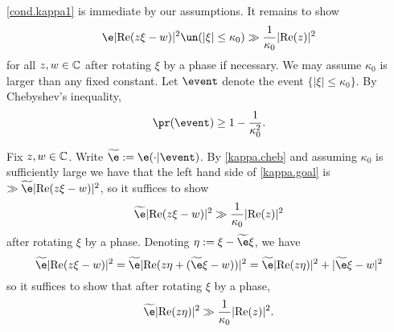 \documentclass[aop,preprint]{imsart}
\theoremstyle{plain}
\newtheorem{lemma}[theorem]{Lemma}
\theoremstyle{definition}
\theoremstyle{remark}
\numberwithin{equation}{section}
\numberwithin{theorem}{section}
\def \re {\mathrm{Re}}
\begin{document}



\eqref{cond.kappa1} is immediate by our assumptions. 
It remains to show 
\begin{equation}	\label{kappa.goal}
\e | \re(z\xi - w)|^2\un(|\xi|\le {\kappa_0}) \gg \frac1{\kappa_0} |\re(z)|^2
\end{equation}
for all $z,w\in {\mathbb C}$ after rotating $\xi$ by a phase if necessary.
We may assume $\kappa_0$ is larger than any fixed constant.
Let $\event$ denote the event $\{|\xi|\le \kappa_0\}$. 
By Chebyshev's inequality,
\begin{equation}	\label{kappa.cheb}
\pr(\event) \ge 1-\frac1{\kappa_0^2}.
\end{equation}

Fix $z,w\in {\mathbb C}$.
Write $\widetilde{\e}:= \e(\cdot|\event)$.
By \eqref{kappa.cheb} and assuming $\kappa_0$ is sufficiently large we have that the left hand side of \eqref{kappa.goal} is $\gg \widetilde{\e}| \re(z\xi - w)|^2$, so it suffices to show
\begin{equation}
\widetilde{\e}| \re(z\xi - w)|^2 \gg \frac{1}{\kappa_0}|\re(z)|^2
\end{equation}
after rotating $\xi$ by a phase.
Denoting $\eta:= \xi -\widetilde{\e}\xi$, we have
\[
\widetilde{\e}| \re(z\xi - w)|^2 = \widetilde{\e}| \re(z\eta + (\widetilde{\e} \xi - w))|^2 
= \widetilde{\e}| \re(z\eta)|^2 + |\widetilde{\e} \xi - w|^2 
\]
so it suffices to show that after rotating $\xi$ by a phase,
\begin{equation}
\widetilde{\e}| \re(z\eta)|^2 \gg \frac{1}{\kappa_0} |\re(z)|^2.
\end{equation}
\end{document}

